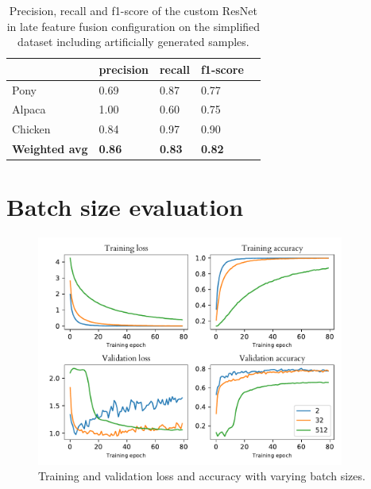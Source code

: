 \documentclass{l4proj}
\begin{document}
\begin{appendices}
\begin{table}[H]
  \centering
  \begin{tabular}{@{}lllll@{}}
  \toprule
                        & \textbf{precision} & \textbf{recall} & \textbf{f1-score} &  \\ \midrule
  Pony                  & 0.69               & 0.87            & 0.77              &  \\
  Alpaca                & 1.00               & 0.60            & 0.75              &  \\
  Chicken               & 0.84               & 0.97            & 0.90              &  \\
  \midrule
  \textbf{Weighted avg} & \textbf{0.86}      & \textbf{0.83}   & \textbf{0.82}     &  \\ \bottomrule
  \end{tabular}
  \caption{Precision, recall and f1-score of the custom ResNet in late feature fusion configuration on the simplified dataset including artificially generated samples.}
  \label{table:auto_scores_auto}
\end{table}


\chapter{Batch size evaluation}
\label{appendix_batch_size}

\begin{figure}[ht]
  \centering
  \includegraphics[width=0.9\textwidth]{images/evaluation/batch_size/history}
  \caption{Training and validation loss and accuracy with varying batch sizes.}
  \label{fig:batch_size}
\end{figure}


\end{appendices}
\end{document}
